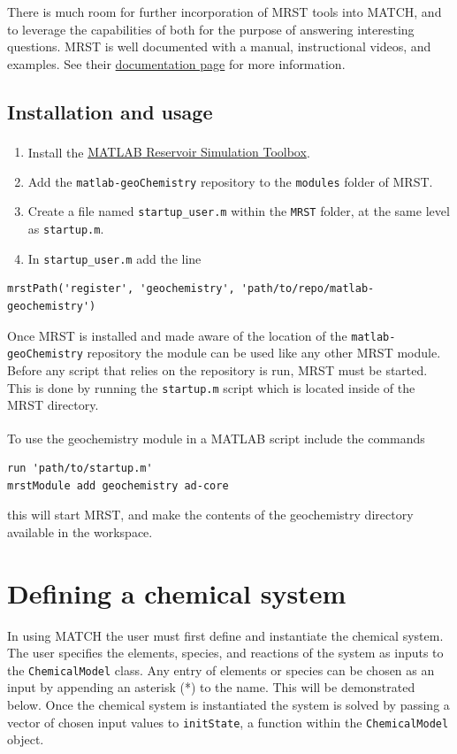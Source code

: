 \documentclass{article}
\begin{document}
There is much room for further incorporation of MRST tools into MATCH, and to leverage the capabilities of both for the purpose of answering interesting questions. MRST is well documented with a manual, instructional videos, and examples. See their \href{http://www.sintef.no/projectweb/mrst/publications/}{documentation page} for more information. 

\subsection{Installation and usage}

\begin{enumerate}
    \item Install the \href{http://www.sintef.no/projectweb/mrst/downloadable-resources/}{MATLAB\textsuperscript{\textregistered} Reservoir Simulation Toolbox}. 
    \item Add the \verb|matlab-geoChemistry| repository to the \verb|modules| folder of MRST.
    \item Create a file named \verb|startup_user.m| within the \verb|MRST| folder, at the same level as \verb|startup.m|.
    \item In \verb|startup_user.m| add the line
\end{enumerate}
\begin{lstlisting}
mrstPath('register', 'geochemistry', 'path/to/repo/matlab-geochemistry')
\end{lstlisting}

Once MRST is installed and made aware of the location of the \verb|matlab-geoChemistry| repository the module can be used like any other MRST module. 
Before any script that relies on the repository is run, MRST must be started. This is done by running the \verb|startup.m| script which is located inside of the MRST directory.

To use the geochemistry module in a MATLAB\textsuperscript{\textregistered} script include the commands

\begin{lstlisting}
run 'path/to/startup.m'
mrstModule add geochemistry ad-core
\end{lstlisting}
this will start MRST, and make the contents of the geochemistry directory available in the workspace.

\section{Defining a chemical system}
In using MATCH the user must first define and instantiate the chemical system. The user specifies the elements, species, and reactions of the system as inputs to the \verb|ChemicalModel| class. Any entry of elements or species can be chosen as an input by appending an asterisk (*) to the name. This will be demonstrated below. Once the chemical system is instantiated the system is solved by passing a vector of chosen input values to \verb|initState|, a function within the \verb|ChemicalModel| object.
\end{document}

